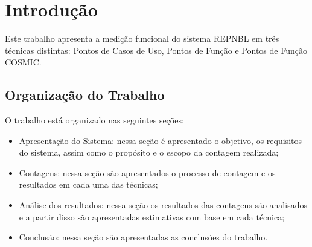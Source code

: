 \chapter[Introdução]{Introdução}

Este trabalho apresenta a medição funcional do sistema REPNBL em três técnicas distintas: Pontos de Casos de Uso, Pontos de Função e Pontos de Função COSMIC.

\section{Organização do Trabalho}

O trabalho está organizado nas seguintes seções:

\begin{itemize}
 
  \item{Apresentação do Sistema:} nessa seção é apresentado o objetivo, os requisitos do sistema, assim como o propósito e o escopo da contagem realizada;

  \item{Contagens:} nessa seção são apresentados o processo de contagem e os resultados em cada uma das técnicas;

  \item{Análise dos resultados:} nessa seção os resultados das contagens são analisados e a partir disso são apresentadas estimativas com base em cada técnica;

  \item{Conclusão:} nessa seção são apresentadas as conclusões do trabalho.

\end{itemize}